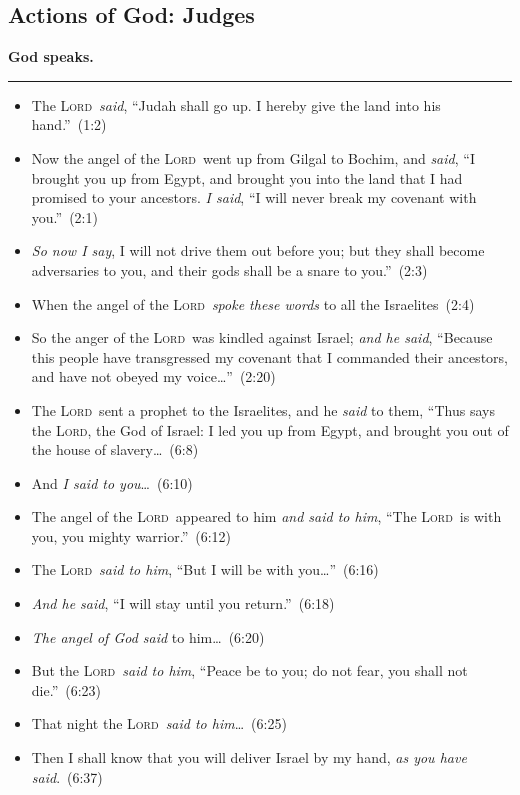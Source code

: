 \documentclass{article}
\newcommand{\godcategory}[1]{\bigskip\noindent \textbf{#1}\smallskip\hrule\nopagebreak}
\newcommand{\Lord}{\textsc{Lord}}
\newcommand{\elips}{\thinspace\ldots}
\begin{document}
\begin{landscape}
\begin{multicols}{3}
\section{Actions of God: Judges}
\godcategory{God speaks.}
\begin{itemize}
  \item The \Lord\ \emph{said}, “Judah shall go up. I hereby give the land into his hand.”~(1:2)
  \item Now the angel of the \Lord\ went up from Gilgal to Bochim, and \emph{said}, “I brought you up from Egypt, and brought you into the land that I had promised to your ancestors. \emph{I said}, “I will never break my covenant with you.”~(2:1)
  \item \emph{So now I say}, I will not drive them out before you; but they shall become adversaries to you, and their gods shall be a snare to you.”~(2:3)
  \item When the angel of the \Lord\ \emph{spoke these words} to all the Israelites~(2:4)
  \item So the anger of the \Lord\ was kindled against Israel; \emph{and he said}, “Because this people have transgressed my covenant that I commanded their ancestors, and have not obeyed my voice\elips”~(2:20)
  \item The \Lord\ sent a prophet to the Israelites, and he \emph{said} to them, “Thus says the \Lord, the God of Israel: I led you up from Egypt, and brought you out of the house of slavery\elips~(6:8)
  \item And \emph{I said to you}\elips~(6:10)
  \item The angel of the \Lord\ appeared to him \emph{and said to him}, “The \Lord\ is with you, you mighty warrior.”~(6:12)
  \item The \Lord\ \emph{said to him}, “But I will be with you\elips''~(6:16)
  \item \emph{And he said}, “I will stay until you return.”~(6:18)
  \item \emph{The angel of God said} to him\elips~(6:20)
  \item But the \Lord\ \emph{said to him}, “Peace be to you; do not fear, you shall not die.”~(6:23)
  \item That night the \Lord\ \emph{said to him}\elips~(6:25)
  \item Then I shall know that you will deliver Israel by my hand, \emph{as you have said}.~(6:37)

\end{itemize}
\end{multicols}
\end{landscape}
\end{document}
